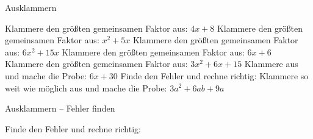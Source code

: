 \setcounter{aufgabe}{19}

\begin{aufgabe}{Ausklammern}
\begin{teile}
\teil Klammere den größten gemeinsamen Faktor aus: $4x + 8$ \leerfeld
\teil Klammere den größten gemeinsamen Faktor aus: $x^2 + 5x$ \leerfeld
\teil Klammere den größten gemeinsamen Faktor aus: $6x^2 + 15x$ \leerfeld
\teil Klammere den größten gemeinsamen Faktor aus: $6x + 6$ \leerfeld
\teil Klammere den größten gemeinsamen Faktor aus: $3x^2 + 6x + 15$ \leerfeld
\teil Klammere aus und mache die Probe: $6x + 30$
\teil Finde den Fehler und rechne richtig: 
\teil Klammere so weit wie möglich aus und mache die Probe: $3a^2 + 6ab + 9a$
\end{teile}
\end{aufgabe}

\begin{aufgabe}{Ausklammern – Fehler finden}
\begin{teile}
\teil Finde den Fehler und rechne richtig: 
\end{teile}
\end{aufgabe}
